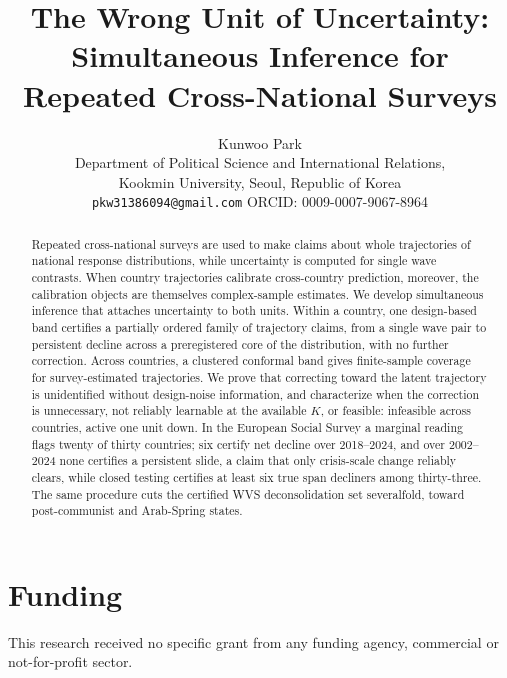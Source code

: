 \documentclass[12pt]{article}
\title{The Wrong Unit of Uncertainty:\\
Simultaneous Inference for Repeated Cross-National Surveys}
\author{Kunwoo Park\\
\small Department of Political Science and International Relations,\\
\small Kookmin University, Seoul, Republic of Korea\\
\small \texttt{pkw31386094@gmail.com} \quad ORCID: 0009-0007-9067-8964}
\date{}
\theoremstyle{definition}
\theoremstyle{remark}
\begin{document}
\maketitle

\begin{abstract}
Repeated cross-national surveys are used to make claims about whole
trajectories of national response distributions, while uncertainty is
computed for single wave contrasts. When country trajectories calibrate
cross-country prediction, moreover, the calibration objects are themselves
complex-sample estimates. We develop simultaneous inference that
attaches uncertainty to both units. Within a country, one design-based band
certifies a partially ordered family of trajectory claims, from a single
wave pair to persistent decline across a preregistered core of the
distribution, with no further correction. Across countries, a clustered
conformal band gives finite-sample coverage for survey-estimated
trajectories. We prove that correcting toward the latent trajectory is
unidentified without design-noise information, and characterize when the
correction is unnecessary, not reliably learnable at the available $K$, or
feasible: infeasible across countries, active one unit down. In the
European Social Survey a marginal reading flags twenty of thirty countries;
six certify net decline over 2018--2024, and over 2002--2024 none certifies a
persistent slide, a claim that only crisis-scale change reliably clears,
while closed testing certifies at least six true span decliners among
thirty-three. The same procedure cuts the certified WVS deconsolidation set
severalfold, toward post-communist and Arab-Spring states.
\end{abstract}










\clearpage

\section*{Funding}
This research received no specific grant from any funding agency, commercial or
not-for-profit sector.
\end{document}
